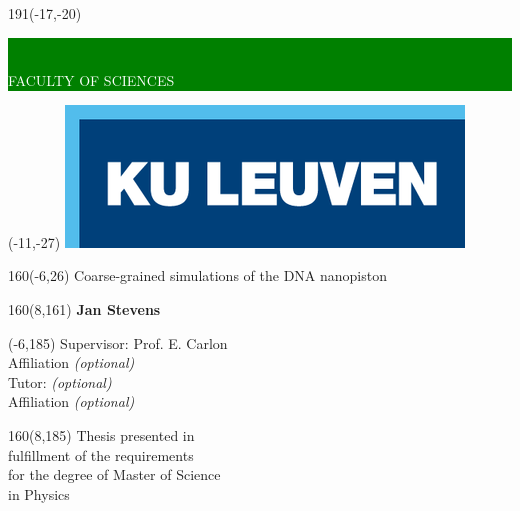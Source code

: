 \thispagestyle{empty}
\newcommand{\form}[1]{\scalebox{1.087}{\boldmath{#1}}}
\sffamily
%
\begin{textblock}{191}(-17,-20)
    \colorbox{green}{\hspace{123mm}\
    \hspace{20mm}\parbox[c][18truemm]{48mm}{\textcolor{white}{FACULTY OF SCIENCES}}}
\end{textblock}
%
\begin{textblock}{70}(-11,-27)
\textblockcolour{}
\includegraphics*[height=19.8truemm]{Figures/LogoKULeuven}
\end{textblock}
%
\begin{textblock}{160}(-6,26)
\textblockcolour{}
\vspace{-\parskip}
\flushleft
\fontsize{40}{38}\selectfont \textcolor{bluetitle}{Coarse-grained simulations of the DNA
nanopiston}\\[1.5mm]
\end{textblock}
%
%
\begin{textblock}{160}(8,161)
\textblockcolour{}
\vspace{-\parskip}
\flushright
\fontsize{14}{16}\selectfont \textbf{Jan Stevens}
\end{textblock}
%
\begin{textblock}{70}(-6,185)
\textblockcolour{}
\vspace{-\parskip}
\flushleft
Supervisor: Prof. E. Carlon\\[-2pt]
\textcolor{blueaff}{Affiliation \textsl{(optional)}}\\[5pt]
Tutor: \textsl{(optional)}\\[-2pt]
\textcolor{blueaff}{Affiliation \textsl{(optional)}}\\
\end{textblock}
%
\begin{textblock}{160}(8,185)
\textblockcolour{}
\vspace{-\parskip}
\flushright
Thesis presented in\\[4.5pt]
fulfillment of the requirements\\[4.5pt]
for the degree of Master of Science\\[4.5pt]
in Physics
\end{textblock}

